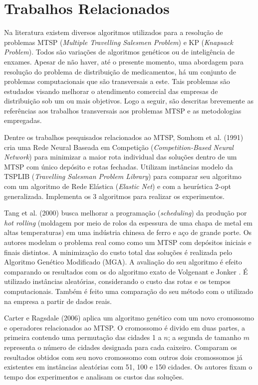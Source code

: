 \chapter{Trabalhos Relacionados}

Na literatura existem diversos algoritmos utilizados para a resolução de problemas MTSP (\textit{Multiple Travelling Salesmen Problem}) e KP (\textit{Knapsack Problem}). Todos são variações de algoritmos genéticos ou de inteligência de enxames. Apesar de não haver, até o presente momento, uma abordagem para resolução do problema de distribuição de medicamentos, há um conjunto de problemas computacionais que são transversais a este. Tais problemas são estudados visando melhorar o atendimento comercial das empresas de distribuição sob um ou mais objetivos. Logo a seguir, são descritas brevemente as referências aos trabalhos transversais aos problemas MTSP e as metodologias empregadas.

Dentre os trabalhos pesquisados relacionados ao MTSP, Somhom et al. (1991) \cite{somhom1999competition} cria uma Rede Neural Baseada em Competição (\textit{Competition-Based Neural Network}) para minimizar a maior rota individual das soluções dentro de um MTSP com único depósito e rotas fechadas. Utilizam instâncias modelo da TSPLIB (\textit{Travelling Salesman Problem Library}) \cite{reinelt1991tsplib} para comparar seu algoritmo com um algoritmo de Rede Elástica (\textit{Elastic Net}) e com a heurística 2-opt generalizada. Implementa os 3 algoritmos para realizar os experimentos.

Tang et al. (2000) \cite{tang2000multiple} busca melhorar a programação (\textit{scheduling}) da produção por \textit{hot rolling} (moldagem por meio de rolos da espessura de uma chapa de metal em altas temperaturas) em uma indústria chinesa de ferro e aço de grande porte. Os autores modelam o problema real como como um MTSP com depósitos iniciais e finais distintos. A minimização do custo total das soluções é realizada pelo Algoritmo Genético Modificado (MGA). A avaliação do seu algoritmo é efeito comparando os resultados com os do algoritmo exato de Volgenant e Jonker \cite{tang2000multiple}. É utilizado instâncias aleatórias, considerando o custo das rotas e os tempos computacionais. Também é feito uma comparação do seu método com o utilizado na empresa a partir de dados reais.

Carter e Ragsdale (2006) \cite{carter2006new} aplica um algoritmo genético com um novo cromossomo e operadores relacionados ao MTSP. O cromossomo é divido em duas partes, a primeira contendo uma permutação das cidades 1 a $n$; a segunda de tamanho $m$ representa o número de cidades designada para cada caixeiro. Comparam os resultados obtidos com seu novo cromossomo com outros dois cromossomos já existentes em instâncias aleatórias com 51, 100 e 150 cidades. Os autores fixam o tempo dos experimentos e analisam os custos das soluções.

